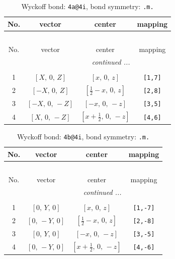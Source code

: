 \documentclass[fleqn,8pt]{jsarticle}
\begin{document}
\begin{longtable}{cccc}
\caption{Wyckoff bond: {\tt 4a@4i}, bond symmetry: {\tt .m.}}
 \\
 \hline \hline
No. & vector & center & mapping \\ \hline \endfirsthead

\multicolumn{3}{l}{\tablename\ \thetable{}} \\
 \hline \hline
No. & vector & center & mapping \\ \hline \endhead

 \hline \hline
\multicolumn{3}{r}{\footnotesize\it continued ...} \\ \endfoot

 \hline \hline
\multicolumn{3}{r}{} \\ \endlastfoot

1 & $\left[ X,\, 0,\, Z \right]$ & $\left[ x,\, 0,\, z \right]$ & {\tt [1,7]} \\ \hline
2 & $\left[ - X,\, 0,\, Z \right]$ & $\left[ \frac{1}{2} - x,\, 0,\, z \right]$ & {\tt [2,8]} \\ \hline
3 & $\left[ - X,\, 0,\, - Z \right]$ & $\left[ - x,\, 0,\, - z \right]$ & {\tt [3,5]} \\ \hline
4 & $\left[ X,\, 0,\, - Z \right]$ & $\left[ x + \frac{1}{2},\, 0,\, - z \right]$ & {\tt [4,6]} \\
\end{longtable}
\renewcommand{\arraystretch}{1.2}
\begin{longtable}{cccc}
\caption{Wyckoff bond: {\tt 4b@4i}, bond symmetry: {\tt .m.}}
 \\
 \hline \hline
No. & vector & center & mapping \\ \hline \endfirsthead

\multicolumn{3}{l}{\tablename\ \thetable{}} \\
 \hline \hline
No. & vector & center & mapping \\ \hline \endhead

 \hline \hline
\multicolumn{3}{r}{\footnotesize\it continued ...} \\ \endfoot

 \hline \hline
\multicolumn{3}{r}{} \\ \endlastfoot

1 & $\left[ 0,\, Y,\, 0 \right]$ & $\left[ x,\, 0,\, z \right]$ & {\tt [1,-7]} \\ \hline
2 & $\left[ 0,\, - Y,\, 0 \right]$ & $\left[ \frac{1}{2} - x,\, 0,\, z \right]$ & {\tt [2,-8]} \\ \hline
3 & $\left[ 0,\, Y,\, 0 \right]$ & $\left[ - x,\, 0,\, - z \right]$ & {\tt [3,-5]} \\ \hline
4 & $\left[ 0,\, - Y,\, 0 \right]$ & $\left[ x + \frac{1}{2},\, 0,\, - z \right]$ & {\tt [4,-6]} \\
\end{longtable}
\end{document}
